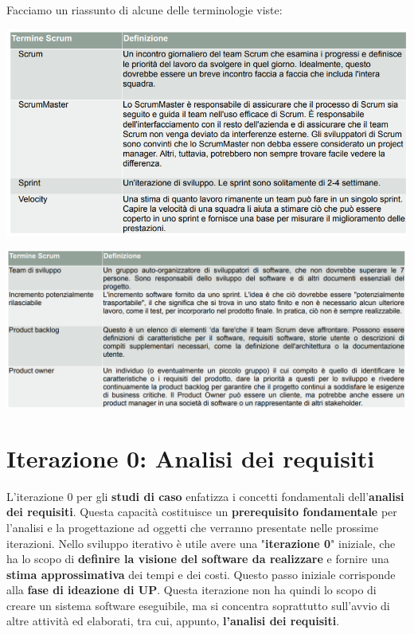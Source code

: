 \documentclass[12pt]{article}
\begin{document}
Facciamo un riassunto di alcune delle terminologie viste:
\begin{center}
    \includegraphics[width = 1\textwidth]{Images/24.png}
\end{center}
\begin{center}
    \includegraphics[width = 1.10\textwidth]{Images/25.png}
\end{center}
\section{Iterazione 0: Analisi dei requisiti}
L'iterazione 0 per gli \textbf{studi di caso} enfatizza i concetti fondamentali dell'\textbf{analisi dei requisiti}.
Questa capacità costituisce un \textbf{prerequisito fondamentale} per l'analisi e la progettazione ad oggetti che verranno presentate nelle prossime iterazioni.
Nello sviluppo iterativo è utile avere una "\textbf{iterazione 0}" iniziale, che ha lo scopo di \textbf{definire la visione del software da realizzare} e fornire una \textbf{stima approssimativa} dei tempi e dei costi.
Questo passo iniziale corrisponde alla \textbf{fase di ideazione di UP}. Questa iterazione non ha quindi lo scopo di creare un sistema software eseguibile, ma si concentra soprattutto sull'avvio di altre attività ed elaborati, tra cui, appunto, \textbf{l'analisi dei requisiti}.
\end{document}
